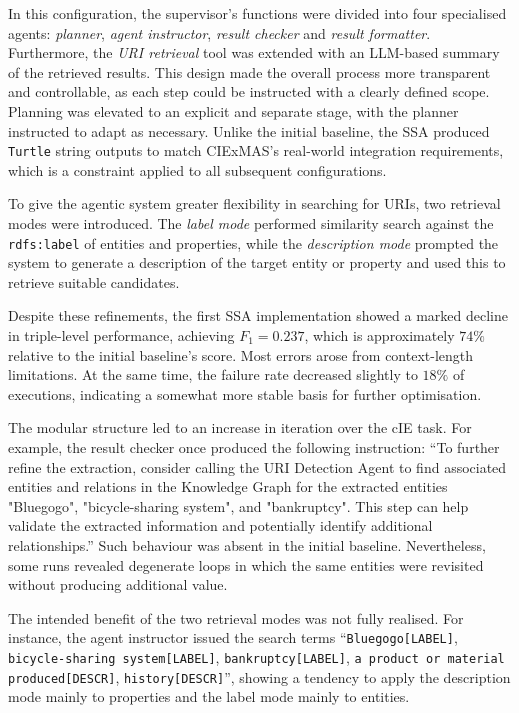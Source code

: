 \documentclass[a4paper,oneside,bibliography=totoc]{scrbook}
\begin{document}
In this configuration, the supervisor’s functions were divided into four specialised agents: \textit{planner}, \textit{agent instructor}, \textit{result checker} and \textit{result formatter}. Furthermore, the \textit{URI retrieval} tool was extended with an \ac{LLM}-based summary of the retrieved results. This design made the overall process more transparent and controllable, as each step could be instructed with a clearly defined scope. Planning was elevated to an explicit and separate stage, with the planner instructed to adapt as necessary. Unlike the initial baseline, the \ac{SSA} produced \texttt{Turtle} string outputs to match CIExMAS’s real-world integration requirements, which is a constraint applied to all subsequent configurations.

To give the agentic system greater flexibility in searching for URIs, two retrieval modes were introduced. The \textit{label mode} performed similarity search against the \texttt{rdfs:label} of entities and properties, while the \textit{description mode} prompted the system to generate a description of the target entity or property and used this to retrieve suitable candidates.

Despite these refinements, the first \ac{SSA} implementation showed a marked decline in triple-level performance, achieving $F_{1}=0.237$, which is approximately \(74\%\) relative to the initial baseline’s score. Most errors arose from context-length limitations. At the same time, the failure rate decreased slightly to \(18\%\) of executions, indicating a somewhat more stable basis for further optimisation.

The modular structure led to an increase in iteration over the \ac{cIE} task. For example, the result checker once produced the following instruction: \enquote{To further refine the extraction, consider calling the URI Detection Agent to find associated entities and relations in the Knowledge Graph for the extracted entities "Bluegogo", "bicycle-sharing system", and "bankruptcy". This step can help validate the extracted information and potentially identify additional relationships.} Such behaviour was absent in the initial baseline. Nevertheless, some runs revealed degenerate loops in which the same entities were revisited without producing additional value.

The intended benefit of the two retrieval modes was not fully realised. For instance, the agent instructor issued the search terms \enquote{\texttt{Bluegogo[LABEL]}, \texttt{bicycle-sharing system[LABEL]}, \texttt{bankruptcy[LABEL]}, \texttt{a product or material produced[DESCR]}, \texttt{history[DESCR]}}, showing a tendency to apply the description mode mainly to properties and the label mode mainly to entities.
\end{document}
